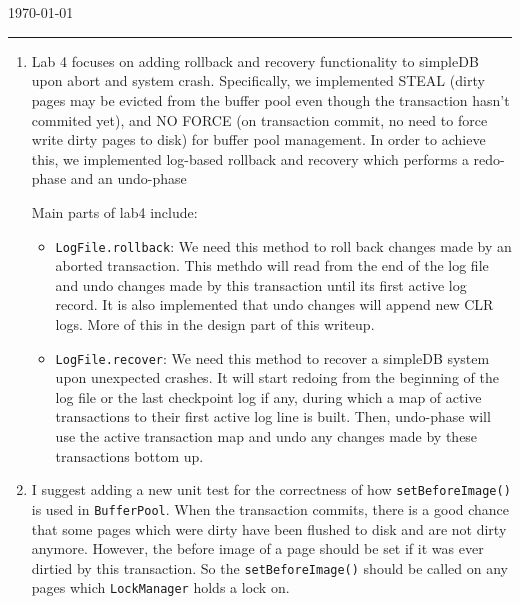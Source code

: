 \documentclass[10pt]{myland}
\begin{document}
\begin{center}
	{\Large {}} \\
	\vspace{.05in}
    \quad{}\\
	\vspace{.05in}
    \today \\
\end{center}
\vspace{.15in} \hrule \vspace{0.5em}%


\begin{enumerate}[label=\textbf{\arabic*.}, listparindent=0.0em, itemsep=2em]
	\item
	Lab 4 focuses on adding rollback and recovery functionality to simpleDB upon abort and system crash. Specifically,
    we implemented STEAL (dirty pages may be evicted from the buffer pool even though the transaction hasn't commited
    yet), and NO FORCE (on transaction commit, no need to force write dirty pages to disk) for buffer pool management.
    In order to achieve this, we implemented log-based rollback and recovery which performs a redo-phase and an undo-phase

    Main parts of lab4 include:
	\begin{itemize}
        \item \texttt{LogFile.rollback}: We need this method to roll back changes made by an aborted transaction. This
        methdo will read from the end of the log file and undo changes made by this transaction until its first active
        log record. It is also implemented that undo changes will append new CLR logs. More of this in the design part
        of this writeup.

        \item \texttt{LogFile.recover}: We need this method to recover a simpleDB system upon unexpected crashes. It
        will start redoing from the beginning of the log file or the last checkpoint log if any, during which a map of
        active transactions to their first active log line is built. Then, undo-phase will use the active transaction
        map and undo any changes made by these transactions bottom up.
	\end{itemize}

    \item I suggest adding a new unit test for the correctness of how \texttt{setBeforeImage()} is used in \texttt{BufferPool}.
    When the transaction commits, there is a good chance that some pages which were dirty have been flushed to disk and
    are not dirty anymore. However, the before image of a page should be set if it was ever dirtied by this transaction.
    So the \texttt{setBeforeImage()} should be called on any pages which \texttt{LockManager} holds a lock on.


\end{enumerate}
\end{document}

